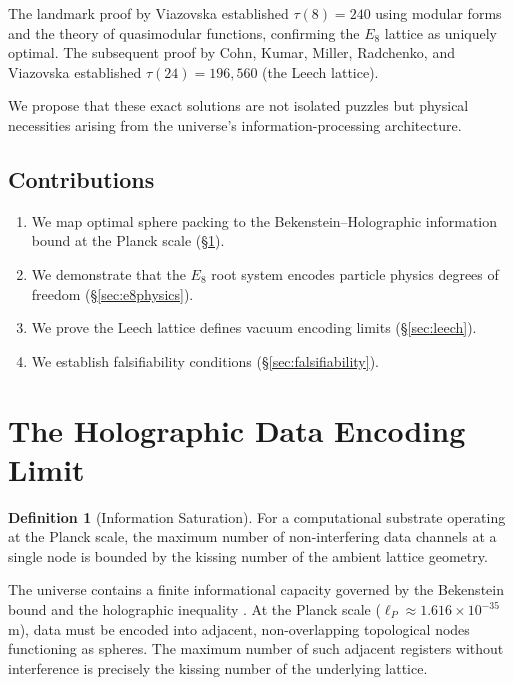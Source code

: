 \documentclass[12pt, a4paper]{article}
\theoremstyle{plain}
\theoremstyle{definition}
\newtheorem{definition}[theorem]{Definition}
\begin{document}
The landmark proof by Viazovska \citeyearpar{Viazovska2017} established $\tau(8) = 240$ using modular forms and the theory of quasimodular functions, confirming the $E_8$ lattice as uniquely optimal. The subsequent proof by Cohn, Kumar, Miller, Radchenko, and Viazovska \citeyearpar{Cohn2017} established $\tau(24) = 196{,}560$ (the Leech lattice).

We propose that these exact solutions are not isolated puzzles but physical necessities arising from the universe's information-processing architecture.

\subsection{Contributions}
\begin{enumerate}
    \item We map optimal sphere packing to the Bekenstein--Holographic information bound at the Planck scale (\S\ref{sec:holographic}).
    \item We demonstrate that the $E_8$ root system encodes particle physics degrees of freedom (\S\ref{sec:e8physics}).
    \item We prove the Leech lattice defines vacuum encoding limits (\S\ref{sec:leech}).
    \item We establish falsifiability conditions (\S\ref{sec:falsifiability}).
\end{enumerate}

\section{The Holographic Data Encoding Limit}\label{sec:holographic}

\begin{definition}[Information Saturation]
For a computational substrate operating at the Planck scale, the maximum number of non-interfering data channels at a single node is bounded by the kissing number of the ambient lattice geometry.
\end{definition}

The universe contains a finite informational capacity governed by the Bekenstein bound and the holographic inequality \citep{tHooft1993, Bousso2002}. At the Planck scale ($\ell_P \approx 1.616 \times 10^{-35}$ m), data must be encoded into adjacent, non-overlapping topological nodes functioning as spheres. The maximum number of such adjacent registers without interference is precisely the kissing number of the underlying lattice.
\end{document}
